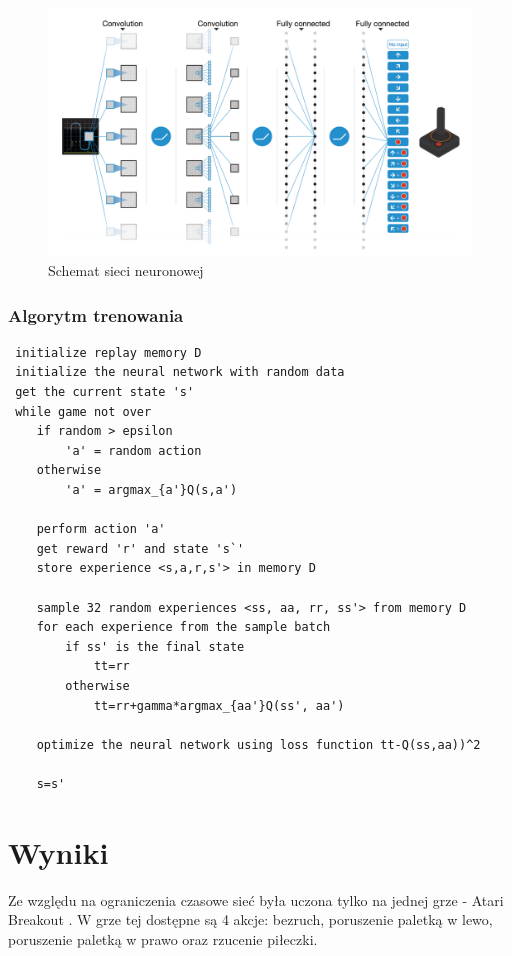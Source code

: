 \documentclass[12pt]{article}
\begin{document}
\begin{figure}[H]
\centering \includegraphics[scale=0.3]{network.png}
\caption{Schemat sieci neuronowej \cite{deepmind_2}}
\label{simple1}
\end{figure}

\subsubsection{Algorytm trenowania}

\begin{lstlisting}
 initialize replay memory D
 initialize the neural network with random data
 get the current state 's'
 while game not over
 	if random > epsilon 
 		'a' = random action
 	otherwise
 		'a' = argmax_{a'}Q(s,a')

	perform action 'a'
	get reward 'r' and state 's`'
	store experience <s,a,r,s'> in memory D
	
	sample 32 random experiences <ss, aa, rr, ss'> from memory D
	for each experience from the sample batch
		if ss' is the final state 
			tt=rr
		otherwise
			tt=rr+gamma*argmax_{aa'}Q(ss', aa')
	
	optimize the neural network using loss function tt-Q(ss,aa))^2
	
	s=s'
\end{lstlisting}

\newpage

\section{Wyniki}
Ze względu na ograniczenia czasowe sieć była uczona tylko na jednej grze - Atari Breakout \cite{breakout}. W grze tej dostępne są 4 akcje: bezruch, poruszenie paletką w lewo, poruszenie paletką w prawo oraz rzucenie piłeczki. 
\end{document}
